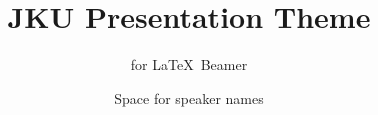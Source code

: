 \documentclass[utf8,aspectratio=169,ngerman,english]{beamer}
\begin{document}


\title{JKU Presentation Theme}

\subtitle{for \LaTeX\ Beamer}

\author{Space for speaker names}



\date[\today]{} %





\end{document}
